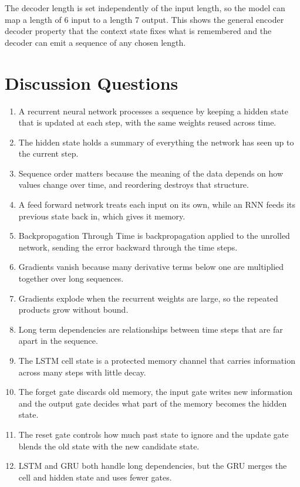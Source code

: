 \documentclass[12pt]{article}
\begin{document}
The decoder length is set independently of the input length, so the model can map a length  of 6 input to a length 7 output. This shows the general encoder decoder property that the context state fixes what is remembered and the decoder can emit a sequence of any chosen length.

\section{Discussion Questions}
\begin{enumerate}
\item A recurrent neural network processes a sequence by keeping a hidden state that is updated at each step, with the same weights reused across time.
\item The hidden state holds a summary of everything the network has seen up to the current step.
\item Sequence order matters because the meaning of the data depends on how values change over time, and reordering destroys that structure.
\item A feed forward network treats each input on its own, while an RNN feeds its previous state back in, which gives it memory.
\item Backpropagation Through Time is backpropagation applied to the unrolled network, sending the error backward through the time steps.
\item Gradients vanish because many derivative terms below one are multiplied together over long sequences.
\item Gradients explode when the recurrent weights are large, so the repeated products grow without bound.
\item Long term dependencies are relationships between time steps that are far apart in the sequence.
\item The LSTM cell state is a protected memory channel that carries information across many steps with little decay.
\item The forget gate discards old memory, the input gate writes new information and the output gate decides what part of the memory becomes the hidden state.
\item The reset gate controls how much past state to ignore and the update gate blends the old state with the new candidate state.
\item LSTM and GRU both handle long dependencies, but the GRU merges the cell and hidden state and uses fewer gates.

\end{enumerate}
\end{document}
